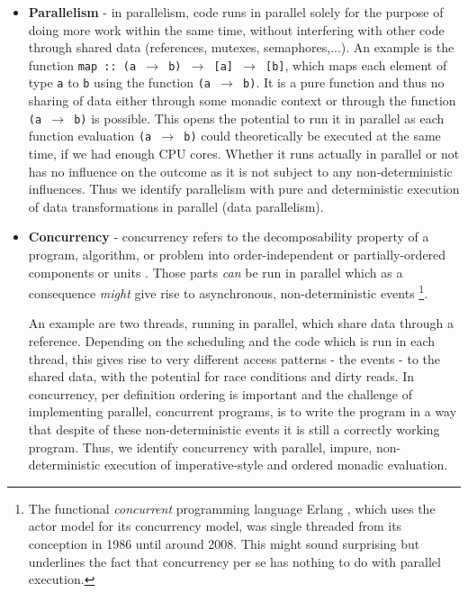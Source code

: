 \begin{itemize}
	\item \textbf{Parallelism} - in parallelism, code runs in parallel solely for the purpose of doing more work within the same time, without interfering with other code through shared data (references, mutexes, semaphores,...). An example is the function \texttt{map :: (a $\rightarrow$ b) $\rightarrow$ [a] $\rightarrow$ [b]}, which maps each element of type \texttt{a} to \texttt{b} using the function \texttt{(a $\rightarrow$ b)}. It is a pure function and thus no sharing of data either through some monadic context or through the function \texttt{(a $\rightarrow$ b)} is possible. This opens the potential to run it in parallel as each function evaluation \texttt{(a $\rightarrow$ b)} could theoretically be executed at the same time, if we had enough CPU cores. Whether it runs actually in parallel or not has no influence on the outcome as it is not subject to any non-deterministic influences. Thus we identify parallelism with pure and deterministic execution of data transformations in parallel (data parallelism).

	\item \textbf{Concurrency} - concurrency refers to the decomposability property of a program, algorithm, or problem into order-independent or partially-ordered components or units \cite{lamport_time_1978}. Those parts \textit{can} be run in parallel which as a consequence \textit{might} give rise to asynchronous, non-deterministic events \footnote{The functional \textit{concurrent} programming language Erlang \cite{armstrong_erlang_2010}, which uses the actor model for its concurrency model, was single threaded from its conception in 1986 until around 2008. This might sound surprising but underlines the fact that concurrency per se has nothing to do with parallel execution.}.

	An example are two threads, running in parallel, which share data through a reference. Depending on the scheduling and the code which is run in each thread, this gives rise to very different access patterns - the events - to the shared data, with the potential for race conditions and dirty reads. In concurrency, per definition ordering is important and the challenge of implementing parallel, concurrent programs, is to write the program in a way that despite of these non-deterministic events it is still a correctly working program. Thus, we identify concurrency with parallel, impure, non-deterministic execution of imperative-style and ordered monadic evaluation.
\end{itemize}

